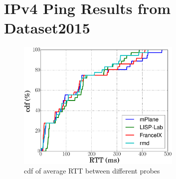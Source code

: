 \section{IPv4 Ping Results from Dataset2015}
\label{sec:pxtr_ping_v4_2015}
    \begin{figure}[!t]
     	\centering
     	\includegraphics[width=0.7\textwidth]{Pics/2015/CDF_RTT_avg.eps}
     	\caption{cdf of average RTT between different probes}
     	\label{CDF_RTT_avg_v4_2015}
     \end{figure}
    
